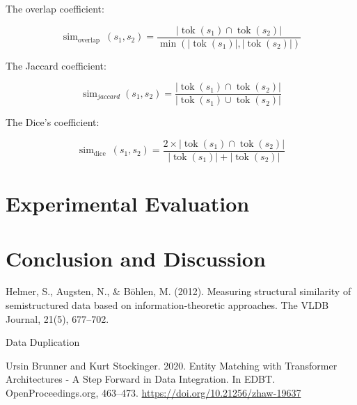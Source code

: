 \documentclass[]{article}
\begin{document}
\noindent
The overlap coefficient:
\begin{center}
\begin{equation}
        \operatorname{sim}_{\text {overlap }}\left(s_{1}, s_{2}\right)=\frac{\left|\operatorname{tok}\left(s_{1}\right) \cap \operatorname{tok}\left(s_{2}\right)\right|}{\min \left(\left|\operatorname{tok}\left(s_{1}\right)\right|,\left|\operatorname{tok}\left(s_{2}\right)\right|\right)}
\end{equation}
\end{center}
\noindent
The Jaccard coefficient:
\begin{center}
\begin{equation}
        \operatorname{sim}_{jaccard}\left(s_{1}, s_{2}\right)=\frac{\left|\operatorname{tok}\left(s_{1}\right) \cap \operatorname{tok}\left(s_{2}\right)\right|}{\left|\operatorname{tok}\left(s_{1}\right) \cup \operatorname{tok}\left(s_{2}\right)\right|}
\end{equation}
\end{center}
\noindent
The Dice's coefficient:
\begin{center}
\begin{equation}
        \operatorname{sim}_{\text {dice }}\left(s_{1}, s_{2}\right)=\frac{2 \times\left|\operatorname{tok}\left(s_{1}\right) \cap \operatorname{tok}\left(s_{2}\right)\right|}{\left|\operatorname{tok}\left(s_{1}\right)\right|+\left|\operatorname{tok}\left(s_{2}\right)\right|}
\end{equation}
\end{center}

\newpage
\section{Experimental Evaluation}

\newpage
\section{Conclusion and Discussion}


\newpage
\begin{thebibliography}{99}

 Helmer, S., Augsten, N., & Böhlen, M. (2012). Measuring structural similarity of semistructured data based on information-theoretic approaches. The VLDB Journal, 21(5), 677–702.

 Data Duplication

 Ursin Brunner and Kurt Stockinger. 2020. Entity Matching with Transformer Architectures - A Step Forward in Data Integration. In EDBT. OpenProceedings.org, 463--473.
\url{https://doi.org/10.21256/zhaw-19637}

\end{thebibliography}
\end{document}
